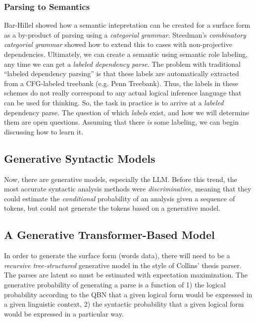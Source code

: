 \documentclass[12pt]{article}
\begin{document}
\subsubsection{Parsing to Semantics}
Bar-Hillel showed how a semantic intepretation can be created for a surface form as a by-product of parsing using a {\em categorial grammar}.
Steedman's {\em combinatory categorial grammar} showed how to extend this to cases with non-projective dependencies.
Ultimately, we can create a semantic using semantic role labeling, any time we can get a {\em labeled dependency parse}.
The problem with traditional ``labeled dependency parsing'' is that these labels are automatically extracted from a CFG-labeled treebank (e.g. Penn Treebank).
Thus, the labels in these schemes do not really correspond to any actual logical inference language that can be used for thinking.
So, the task in practice is to arrive at a {\em labeled} dependency parse.
The question of which {\em labels} exist, and how we will determine them are open questions.
Assuming that there {\em is} some labeling, we can begin discussing how to learn it.

\subsection{Generative Syntactic Models}
Now, there are generative models, especially the LLM.
Before this trend, the most accurate syntactic analysis methods were {\em discriminative}, meaning that they could estimate the {\em conditional} probability of an analysis given a sequence of tokens, but could not generate the tokens based on a generative model.

\subsection{A Generative Transformer-Based Model}
In order to generate the surface form (words data), there will need to be a {\em recursive tree-structured} generative model in the style of Collins' thesis parser.
The parses are latent so must be estimated with expectation maximization.
The generative probability of generating a parse is a function of 1) the logical probability according to the QBN that a given logical form would be expressed in a given linguistic context, 2) the syntactic probability that a given logical form would be expressed in a particular way.
\end{document}

